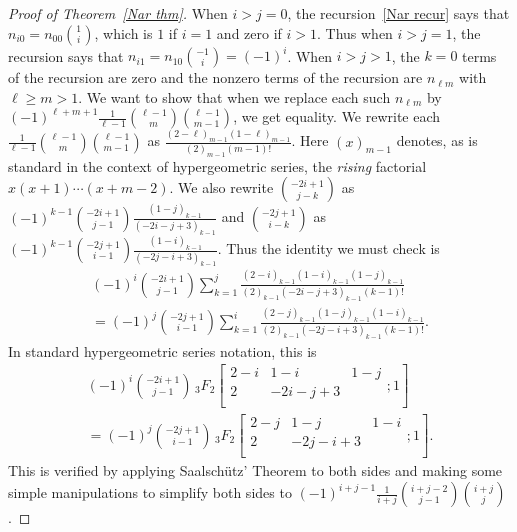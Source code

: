 \documentclass[ALCO,ThmDefs,Unicode,epreuves]{cedram}
\begin{document}
\begin{proof}[Proof of Theorem~\ref{Nar thm}]
When $i>j=0$, the recursion~\eqref{Nar recur} says that $n_{i0}=n_{00}\binom1i$, which is $1$ if $i=1$ and zero if $i>1$.
Thus when $i>j=1$, the recursion says that $n_{i1}=n_{10}\binom{-1}{i}=(-1)^i$. 
When $i>j>1$, the $k=0$ terms of the recursion are zero and the nonzero terms of the recursion are $n_{\ell m}$ with $\ell\ge m>1$.
We want to show that when we replace each such $n_{\ell m}$ by $(-1)^{\ell+m+1}\frac1{\ell-1}\binom{\ell-1}m\binom{\ell-1}{m-1}$, we get equality.
We rewrite each $\frac1{\ell-1}\binom{\ell-1}m\binom{\ell-1}{m-1}$ as $\frac{(2-\ell)_{m-1}(1-\ell)_{m-1}}{(2)_{m-1}(m-1)!}$.
Here $(x)_{m-1}$ denotes, as is standard in the context of hypergeometric series, the \emph{rising} factorial $x(x+1)\cdots(x+m-2)$.
We also rewrite $\binom{-2i+1}{j-k}$ as $(-1)^{k-1}\binom{-2i+1}{j-1}\frac{(1-j)_{k-1}}{(-2i-j+3)_{k-1}}$ and $\binom{-2j+1}{i-k}$ as $(-1)^{k-1}\binom{-2j+1}{i-1}\frac{(1-i)_{k-1}}{(-2j-i+3)_{k-1}}$.
Thus the identity we must check is 
\begin{multline}\label{Nar must check}
(-1)^i\binom{-2i+1}{j-1}\sum_{k=1}^j\frac{(2-i)_{k-1}(1-i)_{k-1}(1-j)_{k-1}}{(2)_{k-1}(-2i-j+3)_{k-1}(k-1)!}\\
=(-1)^j\binom{-2j+1}{i-1}\sum_{k=1}^i\frac{(2-j)_{k-1}(1-j)_{k-1}(1-i)_{k-1}}{(2)_{k-1}(-2j-i+3)_{k-1}(k-1)!}.
\end{multline}
In standard hypergeometric series notation, this is 
\begin{multline}\label{Nar hyper}
(-1)^i\binom{-2i+1}{j-1}\,_3F_2\left[\begin{smallmatrix}2-i&1-i&1-j\\2&-2i-j+3\\\end{smallmatrix};1\right]\\
=(-1)^j\binom{-2j+1}{i-1}\,_3F_2\left[\begin{smallmatrix}2-j&1-j&1-i\\2&-2j-i+3\\\end{smallmatrix};1\right].
\end{multline}
This is verified by applying Saalsch{\"u}tz' Theorem to both sides and making some simple manipulations to simplify both sides to $(-1)^{i+j-1}\frac{1}{i+j}\binom{i+j-2}{j-1}\binom{i+j}{j}$.

\end{proof}
\end{document}

